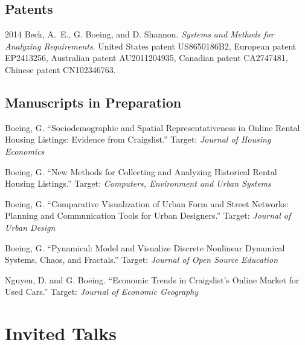 \documentclass{academiccv}
\begin{document}
\subsection*{Patents}

\begin{tablist}

\item[2014] \tab Beck, A.~E., G. Boeing, and D. Shannon. \emph{Systems and Methods for Analyzing Requirements}. United States patent US8650186B2, European patent EP2413256, Australian patent AU2011204935, Canadian patent CA2747481, Chinese patent CN102346763.

\end{tablist}



\subsection*{Manuscripts in Preparation}

\begin{tablist}

\item[\the\year] \tab Boeing, G. \enquote{Sociodemographic and Spatial Representativeness in Online Rental Housing Listings: Evidence from Craigslist.} Target: \emph{Journal of Housing Economics}

\item[\the\year] \tab Boeing, G. \enquote{New Methods for Collecting and Analyzing Historical Rental Housing Listings.} Target: \emph{Computers, Environment and Urban Systems}

\item[\the\year] \tab Boeing, G. \enquote{Comparative Visualization of Urban Form and Street Networks: Planning and Communication Tools for Urban Designers.} Target: \emph{Journal of Urban Design}

\item[\the\year] \tab Boeing, G. \enquote{Pynamical: Model and Visualize Discrete Nonlinear Dynamical Systems, Chaos, and Fractals.} Target: \emph{Journal of Open Source Education}

\item[\the\year] \tab Nguyen, D. and G. Boeing. \enquote{Economic Trends in Craigslist's Online Market for Used Cars.} Target: \emph{Journal of Economic Geography}

\end{tablist}



\section*{Invited Talks}
\end{document}
